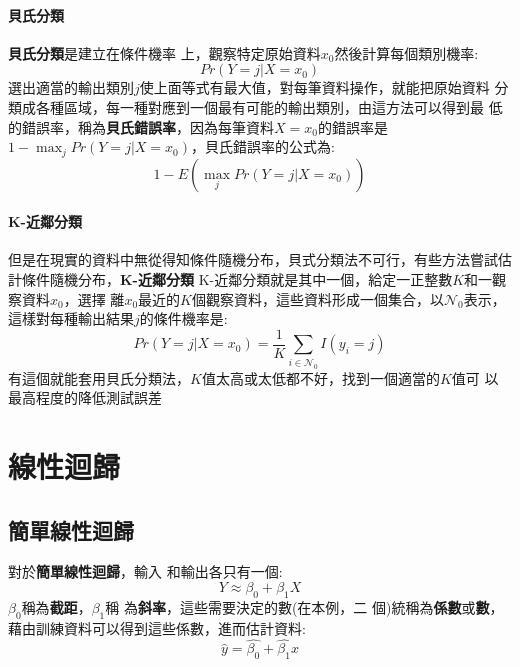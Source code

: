\documentclass{report} %
\begin{document}
      \subsubsection{貝氏分類}
        {\bf 貝氏分類}是建立在條件機率
          上，觀察特定原始資料$x_0 $然後計算每個類別機率:
        \begin{equation}
          Pr(Y = j | X = x_0)
        \end{equation}
        選出適當的輸出類別$j$使上面等式有最大值，對每筆資料操作，就能把原始資料
          分類成各種區域，每一種對應到一個最有可能的輸出類別，由這方法可以得到最
          低的錯誤率，稱為{\bf 貝氏錯誤率}，因為每筆資料$X = x_0$的錯誤率是$1 - \max_j Pr(Y = j|X
          = x_0)$，貝氏錯誤率的公式為:
        \begin{equation}
          1 - E(\max_j Pr(Y = j | X = x_0))
        \end{equation}
      \subsubsection{K-近鄰分類}
        但是在現實的資料中無從得知條件隨機分布，貝式分類法不可行，有些方法嘗試估
          計條件隨機分布，{\bf K-近鄰分類}\marginpar
          {K-近鄰分類}就是其中一個，給定一正整數$K$和一觀察資料$x_0$，選擇
          離$x_0$最近的$K$個觀察資料，這些資料形成一個集合，以$\mathcal{N}
          _0$表示，這樣對每種輸出結果$j$的條件機率是:
        \begin{equation}
          Pr(Y = j | X = x_0) = \frac{1}{K}\sum_{i \in
            {\mathcal{N}_0}}I(y_i = j)
        \end{equation}
        有這個就能套用貝氏分類法，$K$值太高或太低都不好，找到一個適當的$K$值可
          以最高程度的降低測試誤差
\chapter{線性迴歸}
  \section{簡單線性迴歸}
    對於{\bf 簡單線性迴歸}，輸入
      和輸出各只有一個:
    \begin{equation}
      Y \approx \beta_0 + \beta_1X
    \end{equation}
    $\beta_0$稱為{\bf 截距}，$\beta_1$稱
      為{\bf 斜率}，這些需要決定的數(在本例，二
      個)統稱為{\bf 係數}或{\bf 數}，藉由訓練資料可以得到這些係數，進而估計資料:
    \begin{equation}
      \hat{y} = \hat{\beta_0} + \hat{\beta_1}x
    \end{equation}
\end{document}
